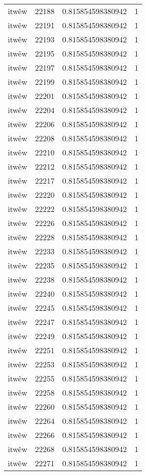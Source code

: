\begin{longtable}{llll}
itwêw & 22188 & 0.815854598380942 & 1 \\
itwêw & 22191 & 0.815854598380942 & 1 \\
itwêw & 22193 & 0.815854598380942 & 1 \\
itwêw & 22195 & 0.815854598380942 & 1 \\
itwêw & 22197 & 0.815854598380942 & 1 \\
itwêw & 22199 & 0.815854598380942 & 1 \\
itwêw & 22201 & 0.815854598380942 & 1 \\
itwêw & 22204 & 0.815854598380942 & 1 \\
itwêw & 22206 & 0.815854598380942 & 1 \\
itwêw & 22208 & 0.815854598380942 & 1 \\
itwêw & 22210 & 0.815854598380942 & 1 \\
itwêw & 22212 & 0.815854598380942 & 1 \\
itwêw & 22217 & 0.815854598380942 & 1 \\
itwêw & 22220 & 0.815854598380942 & 1 \\
itwêw & 22222 & 0.815854598380942 & 1 \\
itwêw & 22226 & 0.815854598380942 & 1 \\
itwêw & 22228 & 0.815854598380942 & 1 \\
itwêw & 22233 & 0.815854598380942 & 1 \\
itwêw & 22235 & 0.815854598380942 & 1 \\
itwêw & 22238 & 0.815854598380942 & 1 \\
itwêw & 22240 & 0.815854598380942 & 1 \\
itwêw & 22245 & 0.815854598380942 & 1 \\
itwêw & 22247 & 0.815854598380942 & 1 \\
itwêw & 22249 & 0.815854598380942 & 1 \\
itwêw & 22251 & 0.815854598380942 & 1 \\
itwêw & 22253 & 0.815854598380942 & 1 \\
itwêw & 22255 & 0.815854598380942 & 1 \\
itwêw & 22258 & 0.815854598380942 & 1 \\
itwêw & 22260 & 0.815854598380942 & 1 \\
itwêw & 22264 & 0.815854598380942 & 1 \\
itwêw & 22266 & 0.815854598380942 & 1 \\
itwêw & 22268 & 0.815854598380942 & 1 \\
itwêw & 22271 & 0.815854598380942 & 1 \\

\end{longtable}
